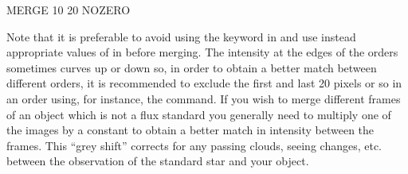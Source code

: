 \begin{command}
      \item {MERGE 10 20 NOZERO}
\end{command}

Note that it is preferable to avoid using the  keyword in
 and use instead appropriate values of  in 
before merging. The intensity at the edges of the orders sometimes curves up
or down so, in order to obtain a better match between different orders, it is
recommended to exclude the first and last 20 pixels or so in an order using,
for instance, the  command. If you wish to merge different frames of
an object which is not a flux standard you generally need to multiply one of
the images by a constant to obtain a better match in intensity between the
frames. This ``grey shift'' corrects for any passing clouds, seeing changes,
etc. between the observation of the standard star and your object.


%

